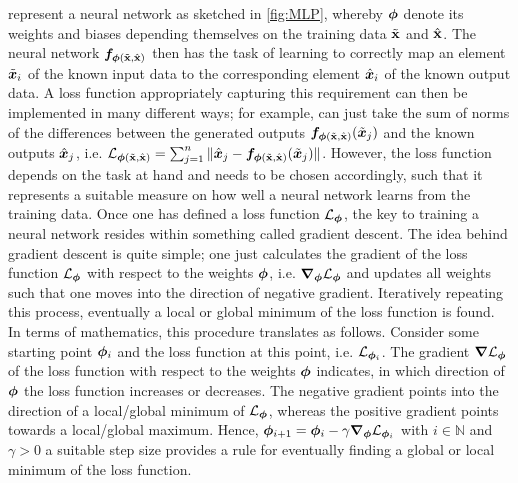 \documentclass[a4paper,11pt]{report}
\def\fc#1{{\color{black}{#1}}} %
\def\lk#1{{\color{black}{#1}}}
\begin{document}
{\begin{equation}
\end{equation} represent a neural network as sketched in \cref{fig:MLP}, whereby $\bm{\phi}$ denote its weights and biases depending themselves on the training data $\tilde{\boldsymbol{\mathbf{x}}}$ and $\hat{\boldsymbol{\mathbf{x}}}$. The neural network $\bm{f}_{\bm{\phi}(\tilde{\boldsymbol{\mathbf{x}}},\hat{\boldsymbol{\mathbf{x}}})}$ then has the task of learning to correctly map an element $\tilde{\bm{x}}_i$ of the known input data to the corresponding element $\hat{\bm{x}}_i$ of the known output data. A loss function appropriately capturing this requirement can then be implemented in many different ways; for example, \lk{one} can just take the sum of norms of the differences between the generated outputs $\bm{f}_{\bm{\phi}(\tilde{\boldsymbol{\mathbf{x}}},\hat{\boldsymbol{\mathbf{x}}})}(\tilde{\bm{x}}_j)$ and the known outputs $\hat{\bm{x}}_j$, i.e. $\mathcal{L}_{\bm{\phi}(\tilde{\boldsymbol{\mathbf{x}}},\hat{\boldsymbol{\mathbf{x}}})} = \sum_{j=1}^{n}\|\hat{\bm{x}}_j-\bm{f}_{\bm{\phi}(\tilde{\boldsymbol{\mathbf{x}}},\hat{\boldsymbol{\mathbf{x}}})}(\tilde{\bm{x}}_j)\|$.} However, the \fc{optimal choice of} loss function depends on the task at hand and needs to be chosen accordingly, such that it represents a suitable measure on how well a neural network learns from the training data. Once one has defined a loss function $\mathcal{L}_{\bm{\phi}}$, the key to training a neural network resides within something called gradient descent. The idea behind gradient descent is quite simple; one just calculates the gradient of the loss function $\mathcal{L}_{\bm{\phi}}$ with respect to the weights $\bm{\phi}$, i.e. $\bm{\nabla}_{\bm{\phi}}\mathcal{L}_{\bm{\phi}}$ and updates all weights such that one moves into the direction of negative gradient. Iteratively repeating this process, eventually a local or global minimum of the loss function is found. In terms of mathematics, this procedure translates as follows. Consider some starting point $\bm{\phi}_i$ and the loss function at this point, i.e. $\mathcal{L}_{\bm{\phi}_i}$. The gradient $\bm{\nabla}\mathcal{L}_{\bm{\phi}}$ of the loss function with respect to the weights $\bm{\phi}$ indicates, in which direction of $\bm{\phi}$ the loss function increases or decreases. The negative gradient points into the direction of a local/global minimum of $\mathcal{L}_{\bm{\phi}}$, whereas the positive gradient points towards a local/global maximum. Hence, $\bm{\phi}_{i+1} = \bm{\phi}_{i} - \gamma \bm{\nabla}_{\bm{\phi}}\mathcal{L}_{\bm{\phi}_i}$ with $i \in \mathbb{N}$ and $\gamma > 0$ a suitable step size provides a rule for eventually finding a global or local minimum of the loss function. 
\end{document}
